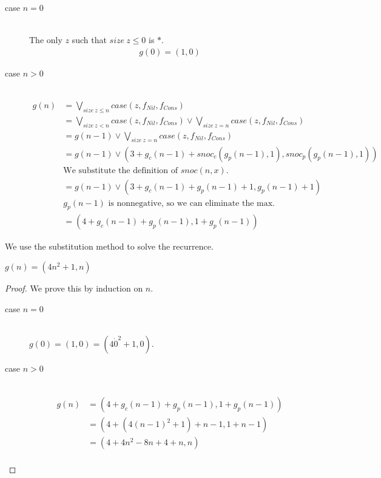\begin{description}
  \item[case $n=0$]\hfill \\
    The only $z$ such that $size\ z \leq 0$ is $\ast$.
    \begin{align*}
      g(0) = (1, 0)
    \end{align*}
  \item[case $n>0$]\hfill \\
    \begin{align*}
      g(n) &= \bigvee\limits_{size\ z \leq n} case(z, f_{Nil}, f_{Cons}) \\
           &= \bigvee\limits_{size\ z < n} case(z, f_{Nil}, f_{Cons}) \vee \bigvee\limits_{size\ z = n} case(z, f_{Nil}, f_{Cons}) \\
           &= g(n-1) \vee \bigvee\limits_{size\ z = n} case(z, f_{Nil}, f_{Cons}) \\
           &= g(n-1) \vee (3 + g_c(n-1) + snoc_c(g_p(n-1), 1), snoc_p(g_p(n-1), 1)) \\
           &\text{We substitute the definition of $snoc(n, x)$.} \\
           &= g(n-1) \vee (3 + g_c(n-1) + g_p(n-1) + 1, g_p(n-1) + 1) \\
           &\text{$g_p(n-1)$ is nonnegative, so we can eliminate the max.} \\
           &= (4 + g_c(n-1) + g_p(n-1), 1 + g_p(n-1))
    \end{align*}
\end{description}
%
We use the substitution method to solve the recurrence.
\begin{lemma}
  $g(n) = (4n^2 + 1, n)$
\end{lemma}
\begin{proof}
  We prove this by induction on $n$.
  \begin{description}
    \item[case $n=0$]\hfill \\
      $g(0) = (1, 0) = (4\dot0^2 + 1, 0)$.
    \item[case $n>0$]\hfill \\
      \begin{align*}
        g(n) &= (4 + g_c(n-1) + g_p(n-1), 1 + g_p(n-1)) \\
             &= (4 + (4(n-1)^2 + 1) + n - 1, 1 + n - 1) \\
             &= (4 + 4n^2 - 8n + 4 + n, n) \\
      \end{align*}
  \end{description}
\end{proof}
